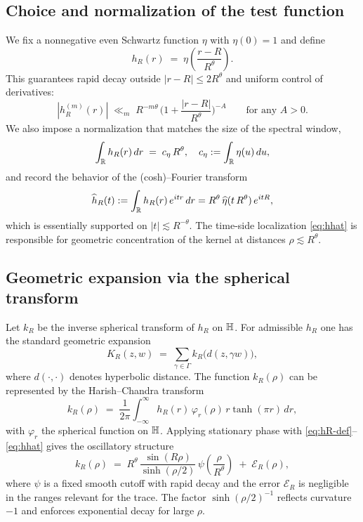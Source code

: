 \subsection{Choice and normalization of the test function}\label{subsec:testfunction}
We fix a nonnegative even Schwartz function $\eta$ with $\eta(0)=1$ and define
\begin{equation}\label{eq:hR-def}
h_R(r) \;=\; \eta\!\left(\frac{r-R}{R^\theta}\right).
\end{equation}
This guarantees rapid decay outside $|r-R|\le 2 R^\theta$ and uniform control of derivatives:
\[
|h_R^{(m)}(r)|
\;\ll_m\; R^{-m\theta}\,\Big(1+\frac{|r-R|}{R^\theta}\Big)^{-A}
\qquad\text{for any }A>0.
\]
We also impose a normalization that matches the size of the spectral window,
\begin{equation}\label{eq:normalization}
\int_{\mathbb{R}} h_R(r)\,dr \;=\; c_\eta\,R^\theta,
\quad c_\eta := \int_{\mathbb{R}}\eta(u)\,du,
\end{equation}
and record the behavior of the (cosh)–Fourier transform
\begin{equation}\label{eq:hhat}
\widehat{h}_R(t) := \int_{\mathbb{R}} h_R(r)\, e^{i t r}\,dr
= R^\theta\,\widehat{\eta}(t\,R^\theta)\,e^{i t R},
\end{equation}
which is essentially supported on $|t|\lesssim R^{-\theta}$. The time-side localization \eqref{eq:hhat} is responsible for geometric concentration of the kernel at distances $\rho\lesssim R^\theta$.

\subsection{Geometric expansion via the spherical transform}\label{subsec:geometric-kernel}
Let $k_R$ be the inverse spherical transform of $h_R$ on $\mathbb{H}$. For admissible $h_R$ one has the standard geometric expansion
\begin{equation}\label{eq:geom-sum}
K_R(z,w) \;=\; \sum_{\gamma\in\Gamma} k_R\!\big(d(z,\gamma w)\big),
\end{equation}
where $d(\cdot,\cdot)$ denotes hyperbolic distance. The function $k_R(\rho)$ can be represented by the Harish--Chandra transform
\[
k_R(\rho) \;=\; \frac{1}{2\pi}\int_{-\infty}^{\infty} h_R(r)\,\varphi_r(\rho)\, r \tanh(\pi r)\, dr,
\]
with $\varphi_r$ the spherical function on $\mathbb{H}$. Applying stationary phase with \eqref{eq:hR-def}--\eqref{eq:hhat} gives the oscillatory structure
\begin{equation}\label{eq:kR-asymp}
k_R(\rho) \;=\; R^\theta\, \frac{\sin(R\rho)}{\sinh(\rho/2)} \,\psi\!\left(\frac{\rho}{R^\theta}\right) \;+\; \mathcal{E}_R(\rho),
\end{equation}
where $\psi$ is a fixed smooth cutoff with rapid decay and the error $\mathcal{E}_R$ is negligible in the ranges relevant for the trace. The factor $\sinh(\rho/2)^{-1}$ reflects curvature $-1$ and enforces exponential decay for large $\rho$.

